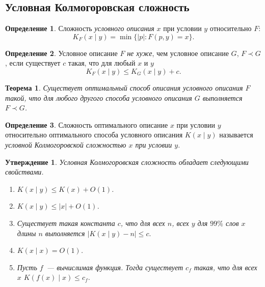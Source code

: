 \documentclass[12pt]{article}
\theoremstyle{definition}
\newtheorem{definition}{Определение}[section]
\theoremstyle{plain}
\newtheorem{theorem}{Теорема}[section]
\newtheorem{statement}{Утверждение}[section]
\theoremstyle{remark}
\begin{document}
\subsection{Условная Колмогоровская сложность}
\begin{definition} Сложность \emph{условного описания} $x$ при условии $y$ относительно $F$:
    \[K_F(x\mid y) = \min\{|p| : F(p,y) = x\}.\]
\end{definition}
\begin{definition} Условное описание $F$ \emph{не хуже}, чем условное описание $G$,
    $F\prec G$, если существует $c$ такая, что для любый $x$ и $y$
    \[
        K_F(x\mid y)\le K_G(x\mid y) + c.
    \]
\end{definition}
\begin{theorem}
    Существует оптимальный способ описания условного описания $F$ такой, что для любого
    другого способа условного описания $G$ выполняется $F\prec G$.  
\end{theorem}
\begin{definition}
    Сложность оптимального описание $x$ при условии $y$ относительно оптимального способа условного описания
    $K(x\mid y)$ называется \emph{условной Колмогоровской сложностью $x$ при условии $y$}.
\end{definition}
\begin{statement}
    Условная Колмогоровская сложность обладает следующими свойствами.
\begin{enumerate}
    \item $K(x\mid y)\le K(x) + O(1)$.
    \item $K(x\mid y)\le |x| + O(1)$.
    \item Существует такая константа $c$, что для всех $n$, всех $y$ для $99\%$
        слов $x$ длины $n$ выполняется \(|K(x\mid y) - n|\le c.\)
    \item $K(x\mid x) = O(1)$.
    \item Пусть $f$~--- вычислимая функция. Тогда существует $c_f$ такая, что
        для всех $x$ $K(f(x)\mid x)\le c_f$. 
\end{enumerate}
\end{statement}
\end{document}
